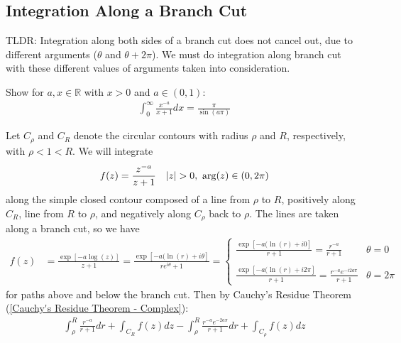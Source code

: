 \documentclass[12pt, english]{book}
\makeatletter
\renewenvironment{proof}[1][\proofname]{\par
	\pushQED{\qed}%
	\normalfont \topsep6\p@\@plus6\p@\relax
	\list{}{%
		\settowidth{\leftmargin}{\itshape\proofname:\hskip\labelsep}%
		\setlength{\labelwidth}{0pt}%
		\setlength{\itemindent}{-\leftmargin}%
	}%
	\item[\hskip\labelsep\itshape#1\@addpunct{:}]\ignorespaces
	}{ \popQED\endlist\@endpefalse}
\makeatother
\begin{document}
	\subsection{Integration Along a Branch Cut} \label{Integration Along a Branch Cut Subsection - Complex}
	
	
	TLDR: Integration along both sides of a branch cut does not cancel out, due to different arguments (\(\theta\) and \(\theta + 2\pi\)). We must do integration along branch cut with these different values of arguments taken into consideration.
	
	\begin{example}
		\label{Integration along branch cut Example - Complex}
		Show for \(a, x \in \mathbb{R}\) with \(x > 0\) and \(a \in (0,1)\):
		\begin{align*}
			\int_{0}^{\infty} \frac{x^{-a}}{x+1} dx = \frac{\pi}{\sin(a\pi)}
		\end{align*}
		\begin{proof}
			Let \(C_\rho\) and \(C_R\) denote the circular contours with radius \(\rho\) and \(R\), respectively, with \(\rho < 1  < R\). We will integrate
			\begin{align*}
				f(z) &= \frac{z^{-a}}{z+1} & \abs{z}>0, \ \arg(z) \in (0, 2\pi)
			\end{align*}
			along the simple closed contour composed of a line from \(\rho\) to \(R\), positively along \(C_R\), line from \(R\) to \(\rho\), and negatively along \(C_\rho\) back to \(\rho\). The lines are taken along a branch cut, so we have 
			\begin{align*}
				f(z) 
				&= \frac{\exp[-a \log(z)]}{z+1} = \frac{\exp[-a (\ln(r) + i\theta]}{re^{i\theta} + 1} 
				= 
				\begin{cases} \displaystyle
					\frac{\exp[-a(\ln(r) + i0]}{r + 1} = \frac{r^{-a}}{r+1} & \theta = 0 \\ \\
					\displaystyle
					\frac{\exp[-a(\ln(r) + i2\pi]}{r + 1} = \frac{r^{-a}e^{-i2a\pi}}{r+1} & \theta = 2\pi
				\end{cases}
			\end{align*}
			for paths above and below the branch cut. Then by Cauchy's Residue Theorem (\cref{Cauchy's Residue Theorem - Complex}):
			\begin{align*}
				\int_{\rho}^{R} \frac{r^{-a}}{r+1} dr 
				+ \int_{C_R} f(z) dz 
				- \int_{\rho}^{R} \frac{r^{-a} e^{-2a\pi}}{r+1} dr
				+ \int_{C_\rho} f(z) dz 

\end{align*}
\end{proof}
\end{example}
\end{document}
